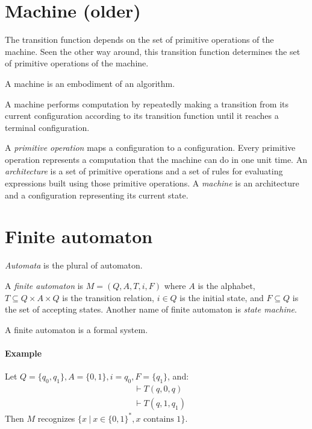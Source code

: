 \section{Machine (older)}

The transition function depends on the set of primitive operations of the machine.
Seen the other way around, this transition function
determines the set of primitive operations of the machine.

A machine is an embodiment of an algorithm.

A machine performs computation by repeatedly
making a transition from its current configuration
according to its transition function
until it reaches a terminal configuration.

A \emph{primitive operation} maps a configuration to a configuration.
Every primitive operation represents a computation that the machine can do in one unit time.
An \emph{architecture} is a set of primitive operations
and a set of rules for evaluating expressions built using those primitive operations.
A \emph{machine} is an architecture and a configuration representing its current state.

\section{Finite automaton}

\emph{Automata} is the plural of automaton.


A
%
\emph{finite automaton} is \(M = (Q,A,T,i,F)\) where
\(A\) is the alphabet,
\(T \subseteq Q \times A \times Q\) is the transition relation,
\(i \in Q\) is the initial state,
and \(F \subseteq Q\) is the set of accepting states.
Another name of finite automaton is
%
\emph{state machine}.

A finite automaton is a formal system.

\paragraph{Example}
Let \(Q = \{q_0,q_1\}, A = \{0,1\}, i = q_0, F = \{q_1\}\), and:
\begin{align*}
    &\vdash T(q,0,q)
    \\
    &\vdash T(q,1,q_1)
\end{align*}
Then \(M\) recognizes \(\{ x ~|~ x \in \{0,1\}^*, x \text{ contains 1}\}\).

